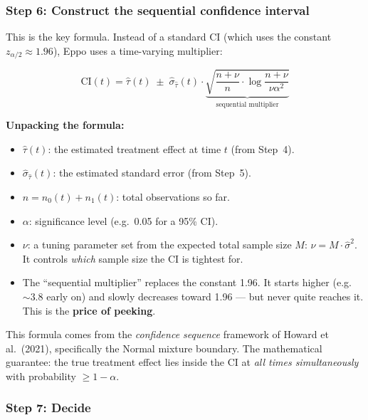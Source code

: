 \documentclass[12pt, a4paper]{article}
\begin{document}
\subsubsection*{Step 6: Construct the sequential confidence interval}

This is the key formula.  Instead of a standard CI (which uses the constant
$z_{\alpha/2} \approx 1.96$), Eppo uses a time-varying multiplier:

\[
  \boxed{\text{CI}(t) = \hat{\tau}(t) \;\pm\;
  \hat{\sigma}_{\hat{\tau}}(t) \cdot
  \underbrace{\sqrt{\frac{n + \nu}{n} \cdot
  \log\!\frac{n + \nu}{\nu \alpha^2}}}_{\text{sequential multiplier}}}
\]

\begin{plainlanguage}
\textbf{Unpacking the formula:}
\begin{itemize}[nosep]
  \item $\hat{\tau}(t)$: the estimated treatment effect at time $t$
        (from Step~4).
  \item $\hat{\sigma}_{\hat{\tau}}(t)$: the estimated standard error
        (from Step~5).
  \item $n = n_0(t) + n_1(t)$: total observations so far.
  \item $\alpha$: significance level (e.g.\ 0.05 for a 95\% CI).
  \item $\nu$: a tuning parameter set from the expected total sample size
        $M$: $\nu = M \cdot \hat{\sigma}^2$.  It controls \emph{which}
        sample size the CI is tightest for.
  \item The ``sequential multiplier'' replaces the constant 1.96.  It
        starts higher (e.g.\ $\sim\!3.8$ early on) and slowly decreases
        toward 1.96 --- but never quite reaches it.  This is the
        \textbf{price of peeking}.
\end{itemize}

This formula comes from the \emph{confidence sequence} framework of
Howard et al.\ (2021), specifically the Normal mixture boundary.  The
mathematical guarantee: the true treatment effect lies inside the CI at
\emph{all times simultaneously} with probability $\geq 1 - \alpha$.
\end{plainlanguage}

\subsubsection*{Step 7: Decide}
\end{document}
